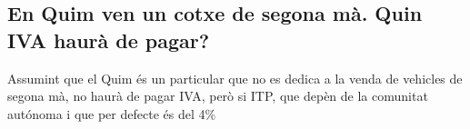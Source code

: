 \subsection{En Quim ven un cotxe de segona mà. Quin IVA haurà de pagar?}

Assumint que el Quim és un particular que no es dedica a la venda de
vehicles de segona mà, no haurà de pagar IVA, però si ITP, que depèn
de la comunitat autónoma i que per defecte és del 4\%
\cite{asesor_contable_iva}

